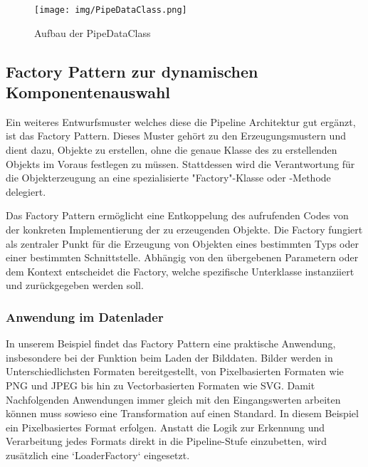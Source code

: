 \documentclass[a4paper]{article} %
\begin{document}
\begin{figure}[htbp]
    \centering
    \texttt{[image: img/PipeDataClass.png]}
    \caption{Aufbau der PipeDataClass}
    \label{fig:pipeDataClass}
\end{figure}

\subsection{Factory Pattern zur dynamischen Komponentenauswahl}
Ein weiteres Entwurfsmuster welches diese die Pipeline Architektur gut ergänzt, ist das Factory Pattern. Dieses Muster gehört zu den Erzeugungsmustern und dient dazu, Objekte zu erstellen, ohne die genaue Klasse des zu erstellenden Objekts im Voraus festlegen zu müssen. Stattdessen wird die Verantwortung für die Objekterzeugung an eine spezialisierte "Factory"-Klasse oder -Methode delegiert.

Das Factory Pattern ermöglicht eine Entkoppelung des aufrufenden Codes von der konkreten Implementierung der zu erzeugenden Objekte. Die Factory fungiert als zentraler Punkt für die Erzeugung von Objekten eines bestimmten Typs oder einer bestimmten Schnittstelle. Abhängig von den übergebenen Parametern oder dem Kontext entscheidet die Factory, welche spezifische Unterklasse instanziiert und zurückgegeben werden soll.

\subsubsection{Anwendung im Datenlader}
In unserem Beispiel findet das Factory Pattern eine praktische Anwendung, insbesondere bei der Funktion beim Laden der Bilddaten. Bilder werden in Unterschiedlichsten Formaten bereitgestellt, von Pixelbasierten Formaten wie PNG und JPEG bis hin zu Vectorbasierten Formaten wie SVG. Damit Nachfolgenden Anwendungen immer gleich mit den Eingangswerten arbeiten können muss sowieso eine Transformation auf einen Standard. In diesem Beispiel ein Pixelbasiertes Format erfolgen. Anstatt die Logik zur Erkennung und Verarbeitung jedes Formats direkt in die Pipeline-Stufe einzubetten, wird zusätzlich eine `LoaderFactory` eingesetzt.
\end{document}
